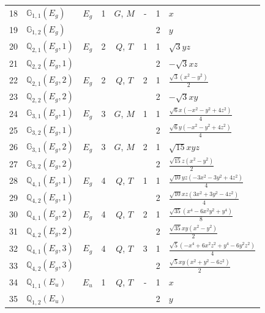 \documentclass[fleqn,10pt,landscape]{jsarticle}
\begin{document}
\begin{longtable}[l]{clcccccl}
18 & $\mathbb{G}_{1,1}(E_{g})$ & $E_{g}$ & 1 & $G$, $M$ & - & 1 & $x$ \\
19 & $\mathbb{G}_{1,2}(E_{g})$ &  &  &  &  & 2 & $y$ \\ \hline
20 & $\mathbb{Q}_{2,1}(E_{g},1)$ & $E_{g}$ & 2 & $Q$, $T$ & 1 & 1 & $\sqrt{3} y z$ \\
21 & $\mathbb{Q}_{2,2}(E_{g},1)$ &  &  &  &  & 2 & $- \sqrt{3} x z$ \\ \hline
22 & $\mathbb{Q}_{2,1}(E_{g},2)$ & $E_{g}$ & 2 & $Q$, $T$ & 2 & 1 & $\frac{\sqrt{3} \left(x^{2} - y^{2}\right)}{2}$ \\
23 & $\mathbb{Q}_{2,2}(E_{g},2)$ &  &  &  &  & 2 & $- \sqrt{3} x y$ \\ \hline
24 & $\mathbb{G}_{3,1}(E_{g},1)$ & $E_{g}$ & 3 & $G$, $M$ & 1 & 1 & $\frac{\sqrt{6} x \left(- x^{2} - y^{2} + 4 z^{2}\right)}{4}$ \\
25 & $\mathbb{G}_{3,2}(E_{g},1)$ &  &  &  &  & 2 & $\frac{\sqrt{6} y \left(- x^{2} - y^{2} + 4 z^{2}\right)}{4}$ \\ \hline
26 & $\mathbb{G}_{3,1}(E_{g},2)$ & $E_{g}$ & 3 & $G$, $M$ & 2 & 1 & $\sqrt{15} x y z$ \\
27 & $\mathbb{G}_{3,2}(E_{g},2)$ &  &  &  &  & 2 & $\frac{\sqrt{15} z \left(x^{2} - y^{2}\right)}{2}$ \\ \hline
28 & $\mathbb{Q}_{4,1}(E_{g},1)$ & $E_{g}$ & 4 & $Q$, $T$ & 1 & 1 & $\frac{\sqrt{10} y z \left(- 3 x^{2} - 3 y^{2} + 4 z^{2}\right)}{4}$ \\
29 & $\mathbb{Q}_{4,2}(E_{g},1)$ &  &  &  &  & 2 & $\frac{\sqrt{10} x z \left(3 x^{2} + 3 y^{2} - 4 z^{2}\right)}{4}$ \\ \hline
30 & $\mathbb{Q}_{4,1}(E_{g},2)$ & $E_{g}$ & 4 & $Q$, $T$ & 2 & 1 & $\frac{\sqrt{35} \left(x^{4} - 6 x^{2} y^{2} + y^{4}\right)}{8}$ \\
31 & $\mathbb{Q}_{4,2}(E_{g},2)$ &  &  &  &  & 2 & $\frac{\sqrt{35} x y \left(x^{2} - y^{2}\right)}{2}$ \\ \hline
32 & $\mathbb{Q}_{4,1}(E_{g},3)$ & $E_{g}$ & 4 & $Q$, $T$ & 3 & 1 & $\frac{\sqrt{5} \left(- x^{4} + 6 x^{2} z^{2} + y^{4} - 6 y^{2} z^{2}\right)}{4}$ \\
33 & $\mathbb{Q}_{4,2}(E_{g},3)$ &  &  &  &  & 2 & $\frac{\sqrt{5} x y \left(x^{2} + y^{2} - 6 z^{2}\right)}{2}$ \\ \hline
34 & $\mathbb{Q}_{1,1}(E_{u})$ & $E_{u}$ & 1 & $Q$, $T$ & - & 1 & $x$ \\
35 & $\mathbb{Q}_{1,2}(E_{u})$ &  &  &  &  & 2 & $y$ \\ \hline

\end{longtable}
\end{document}

